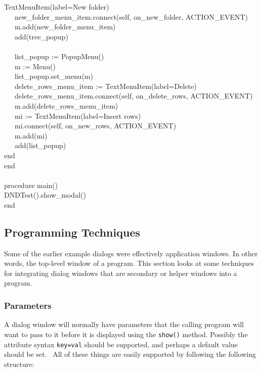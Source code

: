 {TextMenuItem({\textquotedbl}label=New folder{\textquotedbl}) \\
\>   \ \ \ new\_folder\_menu\_item.connect(self,
{\textquotedbl}on\_new\_folder{\textquotedbl}, ACTION\_EVENT) \\
\>   \ \ \ m.add(new\_folder\_menu\_item) \\
\>   \ \ \ add(tree\_popup) \\
\ \\
\>   \ \ \ list\_popup := PopupMenu() \\
\>   \ \ \ m := Menu() \\
\>   \ \ \ list\_popup.set\_menu(m) \\
\>   \ \ \ delete\_rows\_menu\_item :=
TextMenuItem({\textquotedbl}label=Delete{\textquotedbl}) \\
\>   \ \ \ delete\_rows\_menu\_item.connect(self,
{\textquotedbl}on\_delete\_rows{\textquotedbl}, ACTION\_EVENT) \\
\>   \ \ \ m.add(delete\_rows\_menu\_item) \\
\>   \ \ \ mi := TextMenuItem({\textquotedbl}label=Insert
rows{\textquotedbl}) \\
\>   \ \ \ mi.connect(self,
{\textquotedbl}on\_new\_rows{\textquotedbl}, ACTION\_EVENT) \\
\>   \ \ \ m.add(mi) \\
\>   \ \ \ add(list\_popup) \\
\>   end \\
end \\
\ \\
procedure main() \\
\>   DNDTest().show\_modal() \\
end
}

\subsection{Programming Techniques}

Some of the earlier example dialogs were effectively
{\textquotedbl}application windows.{\textquotedbl} In other words, the
top-level window of a program. This section looks at some techniques
for integrating dialog windows that are secondary or helper windows
into a program.

\subsubsection[Parameters]{Parameters}

A dialog window will normally have parameters that the calling program
will want to pass to it before it is displayed using the
\texttt{show()} method. Possibly the attribute syntax
\texttt{{\textquotedbl}key=val{\textquotedbl}} should be supported, and
perhaps a default value should be set. \ All of these things are easily
supported by following the following structure:


